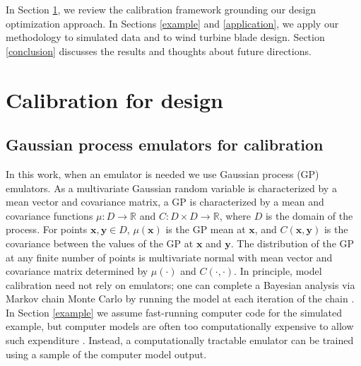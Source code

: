 \documentclass[12pt]{article}
\begin{document}
%
In Section \ref{calib_for_design}, we review the calibration framework grounding our design optimization approach.
%
In Sections \ref{example} and \ref{application}, we apply our methodology to simulated data and to wind turbine blade design.
%
%
Section \ref{conclusion} discusses the results and thoughts about future directions.

%
\section{Calibration for design}\label{calib_for_design}

%
\subsection{Gaussian process emulators for calibration}
%
In this work, when an emulator is needed we use Gaussian process (GP) emulators.
%
As a multivariate Gaussian random variable is characterized by a mean vector and covariance matrix, a GP is characterized by a mean and covariance functions $\mu:D\to \mathbb R$ and $C:D\times D\to \mathbb R$, where $D$ is the domain of the process.
%
For points $\mathbf x,\mathbf y\in D$, $\mu(\mathbf x)$ is the GP mean at $\mathbf x$, and $C(\mathbf x, \mathbf y)$ is the covariance between the values of the GP at $\mathbf x$ and $\mathbf y$.
%
The distribution of the GP at any finite number of points is multivariate normal with mean vector and covariance matrix determined by $\mu(\cdot)$ and $C(\cdot,\cdot)$.
%
In principle, model calibration need not rely on emulators; one can complete a Bayesian analysis via Markov chain Monte Carlo \citep[MCMC;][]{Gelfand1990} by running the model at each iteration of the chain \citep[see e.g.][]{Hemez2011}.
%
In Section \ref{example} we assume fast-running computer code for the simulated example, but
%
computer models are often too computationally expensive to allow such expenditure \citep{VanBuren2013,VanBuren2014}.
%
Instead, a computationally tractable emulator can be trained using a sample of the computer model output.
%
\end{document}
